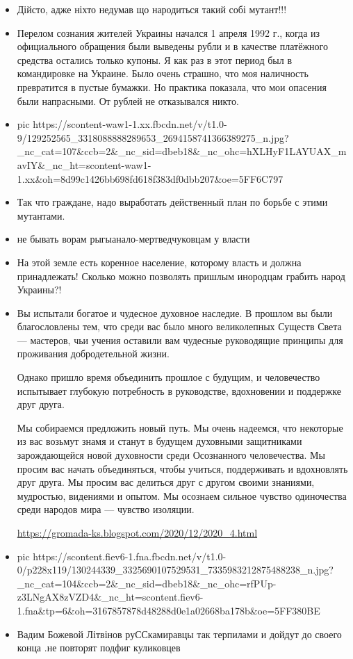 \begin{itemize}
\item {}
Дійсто, адже ніхто недумав що народиться такий собі мутант!!!
\item {}
Перелом сознания жителей Украины начался 1 апреля 1992 г., когда из
официального обращения были выведены рубли и в качестве
платёжного средства остались только купоны. Я как раз в этот
период был в командировке на Украине. Было очень страшно, что
моя наличность превратится в пустые бумажки. Но практика
показала, что мои опасения были напрасными. От рублей не
отказывался никто.
\item {}
\ifcmt
pic https://scontent-waw1-1.xx.fbcdn.net/v/t1.0-9/129252565_3318088888289653_2694158741366389275_n.jpg?_nc_cat=107&ccb=2&_nc_sid=dbeb18&_nc_ohc=hXLHyF1LAYUAX_mavIY&_nc_ht=scontent-waw1-1.xx&oh=8d99c1426bb698fd618f383df0dbb207&oe=5FF6C797
\fi
\item {}
Так что граждане, надо выработать действенный план по борьбе с этими мутантами.

\item {}
не бывать ворам рыгыанало-мертведчуковцам у власти 

\item {}
На этой земле есть коренное население, которому власть и должна принадлежать!
Сколько можно позволять пришлым инородцам грабить народ Украины?!

\item {}
Вы испытали богатое и чудесное духовное наследие. В прошлом вы были
благословлены тем, что среди вас было много великолепных
Существ Света — мастеров, чьи учения оставили вам чудесные
руководящие принципы для проживания добродетельной жизни.

Однако пришло время объединить прошлое с будущим, и человечество испытывает
глубокую потребность в руководстве, вдохновении и поддержке
друг друга.

Мы собираемся предложить новый путь. Мы очень надеемся, что некоторые из вас
возьмут знамя и станут в будущем духовными защитниками
зарождающейся новой духовности среди Осознанного человечества.
Мы просим вас начать объединяться, чтобы учиться, поддерживать
и вдохновлять друг друга. Мы просим вас делиться друг с другом
своими знаниями, мудростью, видениями и опытом. Мы осознаем
сильное чувство одиночества среди народов мира — чувство
изоляции.

\url{https://gromada-ks.blogspot.com/2020/12/2020_4.html}

\item {}
\ifcmt
pic https://scontent.fiev6-1.fna.fbcdn.net/v/t1.0-0/p228x119/130244339_3325690107529531_7335983212875488238_n.jpg?_nc_cat=104&ccb=2&_nc_sid=dbeb18&_nc_ohc=rfPUp-z3LNgAX8zVZD4&_nc_ht=scontent.fiev6-1.fna&tp=6&oh=3167857878d48288d0e1a02668ba178b&oe=5FF380BE
\fi

\item {}
Вадим Божевой Літвінов
руССкамиравцы так терпилами и дойдут до своего конца .не повторят подфиг куликовцев 

\end{itemize}

